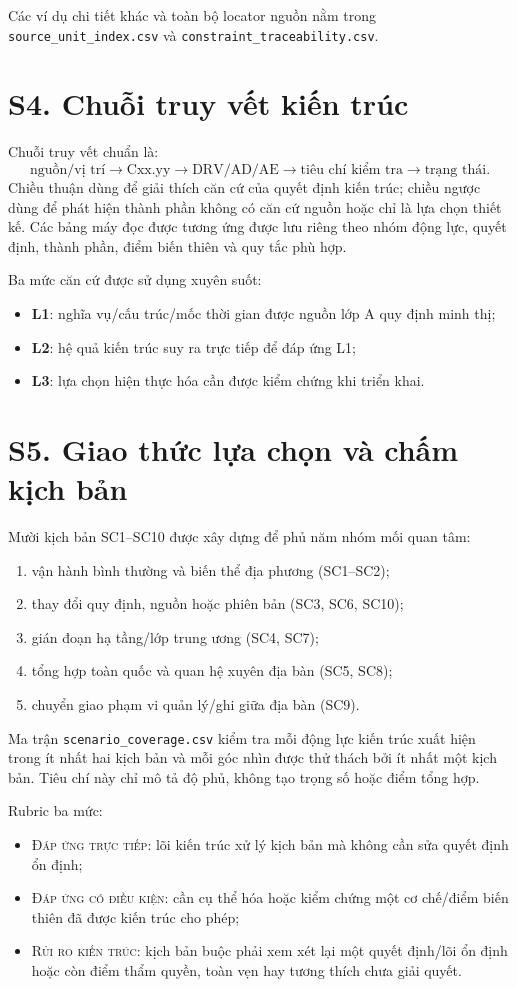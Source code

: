 \documentclass[a4paper,11pt]{article}
\begin{document}
Các ví dụ chi tiết khác và toàn bộ locator nguồn nằm trong \texttt{source\_unit\_index.csv} và \texttt{constraint\_traceability.csv}.

\section*{S4. Chuỗi truy vết kiến trúc}
Chuỗi truy vết chuẩn là:
\[
\text{nguồn/vị trí}\rightarrow \text{Cxx.yy}\rightarrow \text{DRV/AD/AE}\rightarrow \text{tiêu chí kiểm tra}\rightarrow \text{trạng thái}.
\]
Chiều thuận dùng để giải thích căn cứ của quyết định kiến trúc; chiều ngược dùng để phát hiện thành phần không có căn cứ nguồn hoặc chỉ là lựa chọn thiết kế. Các bảng máy đọc được tương ứng được lưu riêng theo nhóm động lực, quyết định, thành phần, điểm biến thiên và quy tắc phù hợp.

Ba mức căn cứ được sử dụng xuyên suốt:
\begin{itemize}
\item \textbf{L1}: nghĩa vụ/cấu trúc/mốc thời gian được nguồn lớp A quy định minh thị;
\item \textbf{L2}: hệ quả kiến trúc suy ra trực tiếp để đáp ứng L1;
\item \textbf{L3}: lựa chọn hiện thực hóa cần được kiểm chứng khi triển khai.
\end{itemize}

\section*{S5. Giao thức lựa chọn và chấm kịch bản}
Mười kịch bản SC1--SC10 được xây dựng để phủ năm nhóm mối quan tâm:
\begin{enumerate}
\item vận hành bình thường và biến thể địa phương (SC1--SC2);
\item thay đổi quy định, nguồn hoặc phiên bản (SC3, SC6, SC10);
\item gián đoạn hạ tầng/lớp trung ương (SC4, SC7);
\item tổng hợp toàn quốc và quan hệ xuyên địa bàn (SC5, SC8);
\item chuyển giao phạm vi quản lý/ghi giữa địa bàn (SC9).
\end{enumerate}
Ma trận \texttt{scenario\_coverage.csv} kiểm tra mỗi động lực kiến trúc xuất hiện trong ít nhất hai kịch bản và mỗi góc nhìn được thử thách bởi ít nhất một kịch bản. Tiêu chí này chỉ mô tả độ phủ, không tạo trọng số hoặc điểm tổng hợp.

Rubric ba mức:
\begin{itemize}
\item \textsc{Đáp ứng trực tiếp}: lõi kiến trúc xử lý kịch bản mà không cần sửa quyết định ổn định;
\item \textsc{Đáp ứng có điều kiện}: cần cụ thể hóa hoặc kiểm chứng một cơ chế/điểm biến thiên đã được kiến trúc cho phép;
\item \textsc{Rủi ro kiến trúc}: kịch bản buộc phải xem xét lại một quyết định/lõi ổn định hoặc còn điểm thẩm quyền, toàn vẹn hay tương thích chưa giải quyết.
\end{itemize}
\end{document}
